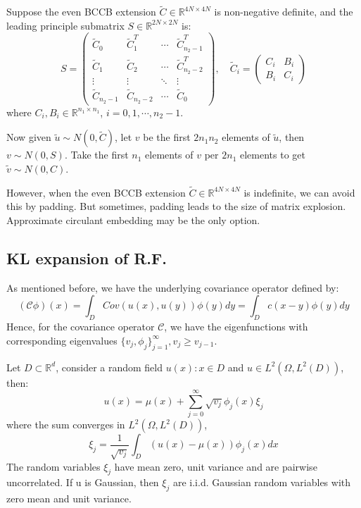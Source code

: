 \begin{algorithm}
    Suppose the even BCCB extension $\tilde{C}\in \mathbb{R}^{4N\times 4N}$ is non-negative definite, and the leading principle submatrix $S\in \mathbb{R}^{2N\times 2N}$ is:
    \begin{equation}
        S = \begin{pmatrix}
            \tilde{C}_0 & \tilde{C}_1^T & \cdots & \tilde{C}_{n_2-1}^T\\
            \tilde{C}_1 & \tilde{C}_2 & \cdots & \tilde{C}_{n_2-2}^T\\
            \vdots & \vdots & \ddots & \vdots\\
            \tilde{C}_{n_2-1} & \tilde{C}_{n_2-2} & \cdots & \tilde{C}_0
        \end{pmatrix},\quad \tilde{C}_i = \begin{pmatrix}
            C_i & B_i\\
            B_i & C_i
        \end{pmatrix}
    \end{equation}
    where $C_i, B_i \in \mathbb{R}^{n_1\times n_1}$, $i = 0, 1, \cdots, n_2-1$. 
    
    Now given $\tilde{u}\sim N(0, \tilde{C})$, let $v$ be the first $2n_1n_2$ elements of $\tilde{u}$, 
    then $v\sim N(0, S)$. Take the first $n_1$ elements of $v$ per $2n_1$ elements to get $\tilde{v}\sim N(0, C)$.
\end{algorithm}

However, when the even BCCB extension $\tilde{C}\in \mathbb{R}^{4N\times 4N}$ is indefinite, we can avoid this by padding. 
But sometimes, padding leads to the size of matrix explosion. Approximate circulant embedding may be the only option.

\subsection{KL expansion of R.F.}
As mentioned before, we have the underlying covariance operator defined by:
\begin{equation}
    (\mathscr{C}\phi)(x) = \int_D Cov(u(x), u(y))\phi(y)dy=\int_D c(x-y)\phi(y)dy
\end{equation}
Hence, for the covariance operator $\mathscr{C}$, we have the eigenfunctions with corresponding eigenvalues $\{v_j, \phi_j\}_{j=1}^{\infty}, v_j\geq v_{j-1}$.
\begin{theorem}
    Let $D\subset \mathbb{R}^d$, consider a random field $u(x): x\in D$ and $u\in L^2(\Omega, L^2(D))$, then:
    \begin{equation}
        u(x) = \mu(x) + \sum_{j=0}^{\infty} \sqrt{v_j} \phi_j(x) \xi_j
    \end{equation}
    where the sum converges in $L^2(\Omega, L^2(D))$, 
    \begin{equation}
        \xi_j = \frac{1}{\sqrt{v_j}}\int_D (u(x)-\mu(x))\phi_j(x)dx
    \end{equation}
    The random variables $\xi_j$ have mean zero, unit variance and are pairwise uncorrelated.
    If u is Gaussian, then $\xi_j$ are i.i.d. Gaussian random variables with zero mean and unit variance.
\end{theorem}


